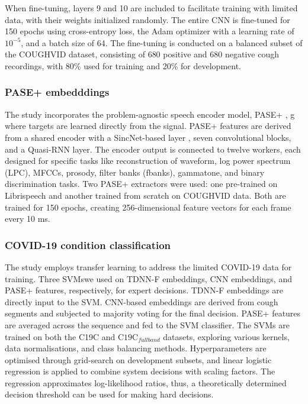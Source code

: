 When fine-tuning, layers 9 and 10 are included to facilitate training with limited data, with their weights initialized randomly. The entire CNN is fine-tuned for 150 epochs using cross-entropy loss, the Adam optimizer with a learning rate of $10^{-5}$, and a batch size of 64. The fine-tuning is conducted on a balanced subset of the COUGHVID dataset, consisting of 680 positive and 680 negative cough recordings, with 80\% used for training and 20\% for development.

\subsubsection{PASE+ embedddings}
The study incorporates the problem-agnostic speech encoder model, PASE+ \cite{Pascual2019,Ravanelli2020}, g where targets are learned directly from the
signal. PASE+ features are derived from a shared encoder with a SincNet-based layer \cite{Sincnet}, seven convolutional blocks, and a Quasi-RNN layer. The encoder output is connected to twelve workers, each designed for specific tasks like reconstruction of waveform, log power spectrum (LPC), MFCCs, prosody, filter banks (fbanks), gammatone, and binary discrimination tasks. Two PASE+ extractors were used: one pre-trained on Librispeech and another trained from scratch on COUGHVID data. Both are trained for 150 epochs, creating 256-dimensional feature vectors for each frame every 10 ms.
\subsubsection{COVID-19 condition classification}
The study employs transfer learning to address the limited COVID-19 data for training. Three SVMswe used on TDNN-F embeddings, CNN embeddings, and PASE+ features, respectively, for expert decisions. TDNN-F embeddings are directly input to the SVM. CNN-based embeddings are derived from cough segments and subjected to majority voting for the final decision. PASE+ features are averaged across the sequence and fed to the SVM classifier. The SVMs are trained on both the C19C and $\text{C19C}_{fullband}$ datasets, exploring various kernels, data normalisations, and class balancing methods. Hyperparameters are optimised through grid-search on development subsets, and linear logistic regression is applied to combine system decisions with scaling factors. The regression approximates log-likelihood ratios, thus, a theoretically determined decision threshold can be used for making hard decisions.
